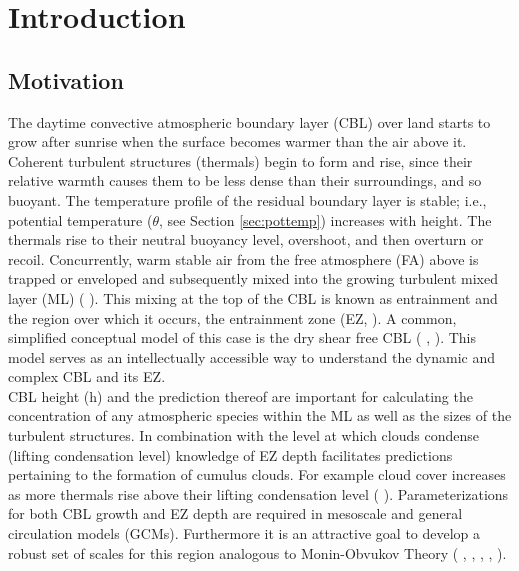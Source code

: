 \chapter{Introduction} 
\label{ch:Introduction}
\setlength{\parindent}{0cm}

\section{Motivation}
\label{sec:Mot}

The daytime convective atmospheric boundary layer (\acs{CBL}) over land starts to grow after sunrise when the surface becomes warmer than the air above it.  Coherent turbulent structures (thermals) begin to form and rise, since their relative warmth causes them to be less dense than their surroundings, and so buoyant.  The temperature profile of the residual boundary layer is stable; i.e., potential temperature ($\theta$, see Section \ref{sec:pottemp}) increases with height.  The thermals rise to their neutral buoyancy level, overshoot, and then overturn or recoil.  Concurrently, warm stable air from the free atmosphere (FA) above is trapped or enveloped and subsequently mixed into the growing turbulent mixed layer (\acs{ML}) (\citeauthor{Stull-BLMetIntro} \citeyear{Stull-BLMetIntro}).  This mixing at the top of the \acs{CBL} is known as entrainment and the region over which it occurs, the entrainment zone (\acs{EZ}, \citeauthor{DearWill80} \citeyear{DearWill80}). A common, simplified conceptual model of this case is the dry shear free \acs{CBL} (\citeauthor{SullMoengStev} \citeyear{SullMoengStev}, \citeauthor{FedConzMir04} \citeyear{FedConzMir04} \citeauthor{BrooksFowler2} \citeyear{BrooksFowler2}). This model serves as an intellectually accessible way to understand the dynamic and complex \acs{CBL} and its \acs{EZ}.\\

\acs{CBL} height (h) and the prediction thereof are important for calculating the concentration of any atmospheric species within the \acs{ML} as well as the sizes of the turbulent structures.  In combination with the level at which clouds condense (lifting condensation level) knowledge of \acs{EZ} depth facilitates predictions pertaining to the formation of cumulus clouds.  For example cloud cover increases as more thermals rise above their lifting condensation level (\citeauthor{WilStu} \citeyear{WilStu}).  Parameterizations for both \acs{CBL} growth and \acs{EZ} depth are required in mesoscale and general circulation models (\acs{GCM}s).  Furthermore it is an attractive goal to develop a robust set of scales for this region analogous to Monin-Obvukov Theory (\citeauthor{Stull-BLMetIntro} \citeyear{Stull-BLMetIntro}, \citeauthor{Traum11} \citeyear{Traum11}, \citeauthor{SteynBaldHoff} \citeyear{SteynBaldHoff}, \citeauthor{StullNelEl} \citeyear{StullNelEl}, \citeauthor{Sorbjan} \citeyear{Sorbjan}).\\

